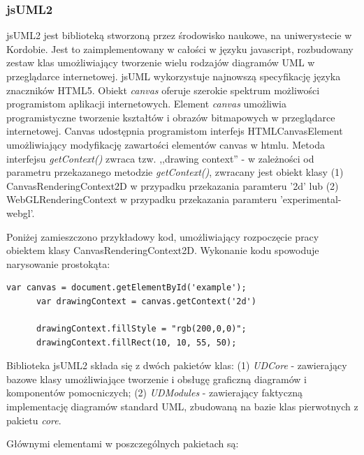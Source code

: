       \subsubsection{jsUML2}
        jsUML2 jest biblioteką stworzoną przez środowisko naukowe, na uniwerystecie w Kordobie. Jest to zaimplementowany w całości w języku javascript, rozbudowany zestaw klas umożliwiający tworzenie wielu rodzajów diagramów UML w przeglądarce internetowej. jsUML wykorzystuje najnowszą specyfikację języka znaczników HTML5. Obiekt \emph{canvas} oferuje szerokie spektrum możliwości programistom aplikacji internetowych. Element \emph{canvas} umożliwia programistyczne tworzenie kształtów i obrazów bitmapowych w przeglądarce internetowej. Canvas udostępnia programistom interfejs HTMLCanvasElement umożliwiający modyfikację zawartości elementów canvas w htmlu. Metoda interfejsu \emph{getContext()} zwraca tzw. ,,drawing context'' - w zależności od parametru przekazanego metodzie \emph{getContext()}, zwracany jest obiekt klasy (1) CanvasRenderingContext2D w przypadku przekazania paramteru '2d' lub (2) WebGLRenderingContext w przypadku przekazania paramteru 'experimental-webgl'.

        Poniżej zamieszczono przykładowy kod, umożliwiający rozpoczęcie pracy obiektem klasy CanvasRenderingContext2D. Wykonanie kodu spowoduje narysowanie prostokąta:

      \begin{lstlisting}[caption={przykład HTML5 canvas}, label={lst:canvas1}]
      var canvas = document.getElementById('example');
      var drawingContext = canvas.getContext('2d')

      drawingContext.fillStyle = "rgb(200,0,0)";  
      drawingContext.fillRect(10, 10, 55, 50);
      \end{lstlisting}

        Biblioteka jsUML2 składa się z dwóch pakietów klas: (1) \emph{UDCore} - zawierający bazowe klasy umożliwiające tworzenie i obsługę graficzną diagramów i komponentów pomocniczych; (2) \emph{UDModules} - zawierający faktyczną implementację diagramów standard UML, zbudowaną na bazie klas pierwotnych z pakietu \emph{core}.

        Głównymi elementami w poszczególnych pakietach są:

